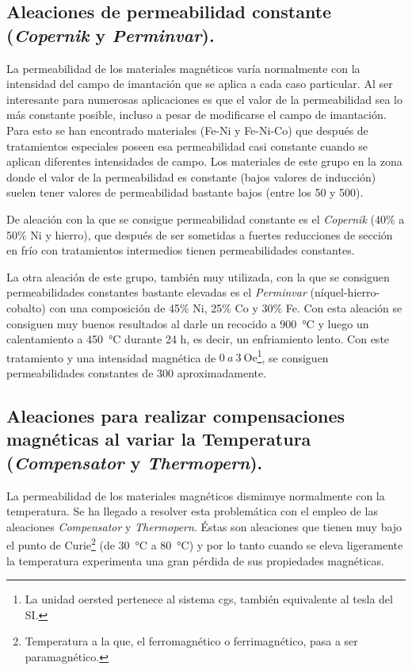 \documentclass[12pt,a4paper]{article}
\begin{document}
\subsection{Aleaciones de permeabilidad constante (\textit{Copernik} y \textit{Perminvar}).}

La permeabilidad de los materiales magnéticos varía normalmente con la intensidad del campo de imantación que se aplica a cada caso particular. Al ser interesante para numerosas aplicaciones es que el valor de la permeabilidad sea lo más constante posible, incluso a pesar de modificarse el campo de imantación. Para esto se han encontrado materiales (Fe-Ni y Fe-Ni-Co) que después de tratamientos especiales poseen esa permeabilidad casi constante cuando se aplican diferentes intensidades de campo. Los materiales de este grupo en la zona donde el valor de la permeabilidad es constante (bajos valores de inducción) suelen tener valores de permeabilidad bastante bajos (entre los 50 y 500).

De aleación con la que se consigue permeabilidad constante es el \textit{Copernik} (40\% a 50\% Ni y hierro), que después de ser sometidas a fuertes reducciones de sección en frío con tratamientos intermedios tienen permeabilidades constantes.

La otra aleación de este grupo, también muy utilizada, con la que se consiguen permeabilidades constantes bastante elevadas es el \textit{Perminvar} (níquel-hierro-cobalto) con una composición de 45\% Ni, 25\% Co y 30\% Fe. Con esta aleación se consiguen muy buenos resultados al darle un recocido a \SI{900}{\celsius} y luego un calentamiento a \SI{450}{\celsius} durante 24 h, es decir, un enfriamiento lento. Con este tratamiento y una intensidad magnética de $0\ a\ 3\ \mathrm{Oe}$\footnote{La unidad oersted pertenece al sistema cgs, también equivalente al tesla del SI.}, se consiguen permeabilidades constantes de 300 aproximadamente.

\subsection{Aleaciones para realizar compensaciones magnéticas al variar la Temperatura (\textit{Compensator} y \textit{Thermopern}).}

La permeabilidad de los materiales magnéticos disminuye normalmente con la temperatura. Se ha llegado a resolver esta problemática con el empleo de las aleaciones \textit{Compensator} y \textit{Thermopern}. Éstas son aleaciones que tienen muy bajo el punto de Curie\footnote{Temperatura a la que, el ferromagnético o ferrimagnético, pasa a ser paramagnético.} (de \SI{30}{\celsius} a \SI{80}{\celsius}) y por lo tanto cuando se eleva ligeramente la temperatura experimenta una gran pérdida de sus propiedades magnéticas.
\end{document}
